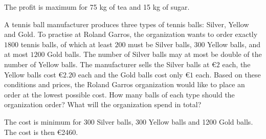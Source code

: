 \begin{Answer}
    The profit is maximum for 75 kg of tea and 15 kg of sugar.
\end{Answer}

\begin{Exercise}[difficulty = 2] A tennis ball manufacturer produces three types of tennis balls: Silver, Yellow and Gold. To practise at Roland Garros, the organization wants to order exactly $1800$ tennis balls, of which at least $200$ must be Silver balls, $300$ Yellow balls, and at most $1200$  Gold balls. The number of Silver balls may at most be double of the number of Yellow balls.
The manufacturer sells the Silver balls at \euro $2$ each, the Yellow balls cost \euro $2.20$ each and the Gold balls cost only \euro $1$ each. Based on these conditions and prices, the Roland Garros organization would like to place an order at the lowest possible cost. How many balls of each type should the organization order? What will the organization spend in total?
\end{Exercise}

\begin{Answer}
    The cost is minimum for 300 Silver balls, 300 Yellow balls and 1200 Gold balls. The cost is then \euro 2460.
\end{Answer}

